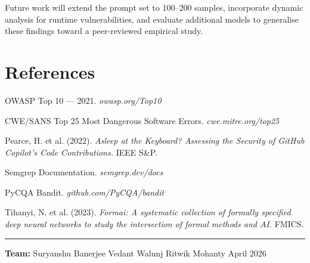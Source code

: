 \documentclass[11pt,a4paper]{article}
\begin{document}
Future work will extend the prompt set to 100–200 samples, incorporate dynamic analysis for runtime vulnerabilities, and evaluate additional models to generalise these findings toward a peer-reviewed empirical study.

\section*{References}
\begin{enumerate}[leftmargin=*, label={[\arabic*]}]
  \item OWASP Top 10 — 2021. \textit{owasp.org/Top10}
  \item CWE/SANS Top 25 Most Dangerous Software Errors. \textit{cwe.mitre.org/top25}
  \item Pearce, H. et al. (2022). \textit{Asleep at the Keyboard? Assessing the Security of GitHub Copilot's Code Contributions.} IEEE S\&P.
  \item Semgrep Documentation. \textit{semgrep.dev/docs}
  \item PyCQA Bandit. \textit{github.com/PyCQA/bandit}
  \item Tihanyi, N. et al. (2023). \textit{Formai: A systematic collection of formally specified deep neural networks to study the intersection of formal methods and AI.} FMICS.
\end{enumerate}

\vspace{16pt}
\noindent\rule{\linewidth}{0.4pt}
{\small\color{midgray}
\textbf{Team:} Suryanshu Banerjee \quad Vedant Walunj \quad Ritwik Mohanty \hfill April 2026}
\end{document}
